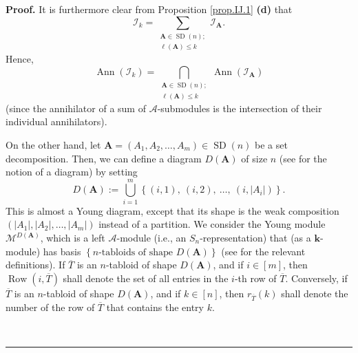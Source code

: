\documentclass[numbers=enddot,12pt,final,onecolumn,notitlepage]{scrartcl}%
\numberwithin{exer}{subsection}
\theoremstyle{definition}
\newenvironment{proof}[1][Proof]{\noindent\textbf{#1.} }{\ \rule{0.5em}{0.5em}}
\let\sumnonlimits\sum
\let\cupnonlimits\bigcup
\let\capnonlimits\bigcap
\renewcommand{\sum}{\sumnonlimits\limits}
\renewcommand{\bigcup}{\cupnonlimits\limits}
\renewcommand{\bigcap}{\capnonlimits\limits}
\begin{document}
\begin{proof}
It is furthermore clear from Proposition \ref{prop.IJ.1} \textbf{(d)} that%
\begin{equation}
\mathcal{I}_{k}=\sum_{\substack{\mathbf{A}\in\operatorname*{SD}\left(
n\right)  ;\\\ell\left(  \mathbf{A}\right)  \leq k}}\mathcal{I}_{\mathbf{A}}.
\label{pf.thm.AnnVkn.Ik=sum}%
\end{equation}
Hence,%
\begin{equation}
\operatorname*{Ann}\left(  \mathcal{I}_{k}\right)  =\bigcap
_{\substack{\mathbf{A}\in\operatorname*{SD}\left(  n\right)  ;\\\ell\left(
\mathbf{A}\right)  \leq k}}\operatorname*{Ann}\left(  \mathcal{I}_{\mathbf{A}%
}\right)  \label{pf.thm.AnnVkn.Ik=sum2}%
\end{equation}
(since the annihilator of a sum of $\mathcal{A}$-submodules is the
intersection of their individual annihilators).

On the other hand, let $\mathbf{A}=\left(  A_{1},A_{2},\ldots,A_{m}\right)
\in\operatorname*{SD}\left(  n\right)  $ be a set decomposition. Then, we can
define a diagram $D\left(  \mathbf{A}\right)  $ of size $n$ (see
\cite[Definition 5.1.2]{sga} for the notion of a diagram) by setting%
\[
D\left(  \mathbf{A}\right)  :=\bigcup_{i=1}^{m}\left\{  \left(  i,1\right)
,\ \left(  i,2\right)  ,\ \ldots,\ \left(  i,\left\vert A_{i}\right\vert
\right)  \right\}  .
\]
This is almost a Young diagram, except that its shape is the weak composition
$\left(  \left\vert A_{1}\right\vert ,\left\vert A_{2}\right\vert
,\ldots,\left\vert A_{m}\right\vert \right)  $ instead of a partition. We
consider the Young module $\mathcal{M}^{D\left(  \mathbf{A}\right)  }$, which
is a left $\mathcal{A}$-module (i.e., an $S_{n}$-representation) that (as a
$\mathbf{k}$-module) has basis $\left\{  n\text{-tabloids of shape }D\left(
\mathbf{A}\right)  \right\}  $ (see \cite[\S 5.3]{sga} for the relevant
definitions). If $\overline{T}$ is an $n$-tabloid of shape $D\left(
\mathbf{A}\right)  $, and if $i\in\left[  m\right]  $, then
$\operatorname*{Row}\left(  i,\overline{T}\right)  $ shall denote the set of
all entries in the $i$-th row of $\overline{T}$. Conversely, if $\overline{T}$
is an $n$-tabloid of shape $D\left(  \mathbf{A}\right)  $, and if $k\in\left[
n\right]  $, then $r_{\overline{T}}\left(  k\right)  $ shall denote the number
of the row of $\overline{T}$ that contains the entry $k$.


\end{proof}
\end{document}
